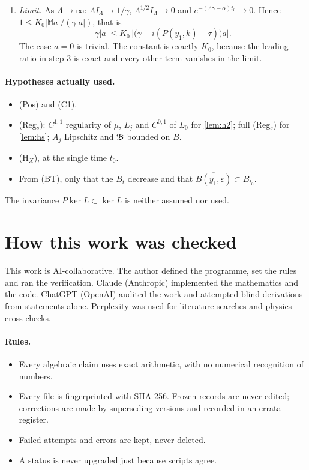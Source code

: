 \documentclass[11pt]{article}
\theoremstyle{plain}
\theoremstyle{definition}
\theoremstyle{remark}
\begin{document}
\begin{enumerate}
  \[
    I_\Lambda := \int_0^{t_0}e^{-(\Lambda\gamma - \alpha)(t_0-\sigma)}\,d\sigma = \frac{1 - e^{-(\Lambda\gamma-\alpha)t_0}}{\Lambda\gamma - \alpha} .
  \]
  This gives
  \[
    1 - O(\Lambda^{-1/2}) \;\le\; 2K_0e^{-(\Lambda\gamma-\alpha)t_0} + K_0\,\frac{|\mathbb Ma|}{|a|}\,\Lambda I_\Lambda + K_0C_E\,\Lambda^{1/2}I_\Lambda .
  \]
  \item \emph{Limit.} As $\Lambda \to \infty$: $\Lambda I_\Lambda \to 1/\gamma$, $\Lambda^{1/2}I_\Lambda \to 0$ and $e^{-(\Lambda\gamma-\alpha)t_0} \to 0$. Hence $1 \le K_0|\mathbb Ma|/(\gamma|a|)$, that is
  \[
    \gamma|a| \le K_0\,\bigl|\bigl(\gamma - i(P(y_1,k) - \tau)\bigr)a\bigr| .
  \]
  The case $a = 0$ is trivial. The constant is exactly $K_0$, because the leading ratio in step 3 is exact and every other term vanishes in the limit.
\end{enumerate}

\paragraph{Hypotheses actually used.}
\begin{itemize}
  \item (Pos) and (C1).
  \item (Reg$_s$): $C^{1,1}$ regularity of $\mu$, $L_j$ and $C^{0,1}$ of $L_0$ for \cref{lem:h2}; full (Reg$_s$) for \cref{lem:hs}; $A_j$ Lipschitz and $\mathfrak B$ bounded on $B$.
  \item (H$_X$), at the single time $t_0$.
  \item From (BT), only that the $B_t$ decrease and that $\overline{B(y_1,\varepsilon)} \subset B_{t_0}$.
\end{itemize}
The invariance $P\ker L \subset \ker L$ is neither assumed nor used.

\section{How this work was checked}\label{app:checking}

This work is AI-collaborative. The author defined the programme, set the rules and ran the verification. Claude (Anthropic) implemented the mathematics and the code. ChatGPT (OpenAI) audited the work and attempted blind derivations from statements alone. Perplexity was used for literature searches and physics cross-checks.

\paragraph{Rules.}
\begin{itemize}
  \item Every algebraic claim uses exact arithmetic, with no numerical recognition of numbers.
  \item Every file is fingerprinted with SHA-256. Frozen records are never edited; corrections are made by superseding versions and recorded in an errata register.
  \item Failed attempts and errors are kept, never deleted.
  \item A status is never upgraded just because scripts agree.
\end{itemize}
\end{document}
